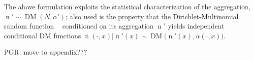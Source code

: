 \documentclass[12pt]{report}
\DeclareMathOperator{\xrm}{\mathrm{x}}
\DeclareMathOperator{\yrm}{\mathrm{y}}
\DeclareMathOperator{\nrm}{\mathrm{n}}
\DeclareMathOperator{\nbarrm}{\bar{\mathrm{n}}}
\DeclareMathOperator{\Prm}{\mathrm{P}}
\DeclareMathOperator{\Erm}{\mathrm{E}}
\DeclareMathOperator{\Xcal}{\mathcal{X}}
\DeclareMathOperator{\Ycal}{\mathcal{Y}}
\DeclareMathOperator{\Ncal}{\mathcal{N}}
\DeclareMathOperator{\DM}{\mathrm{DM}}
\begin{document}
The above formulation exploits the statistical characterization of the aggregation, $\nrm' \sim \DM(N,\alpha')$; also used is the property that the Dirichlet-Multinomial random function $\nbarrm$ conditioned on its aggregation $\nrm'$ yields independent  conditional DM functions $\bar{\nrm}(\cdot,x) | \nrm'(x) \sim \DM\big( \nrm'(x),\alpha(\cdot,x) \big)$.

PGR: move to appendix???
\end{document}
